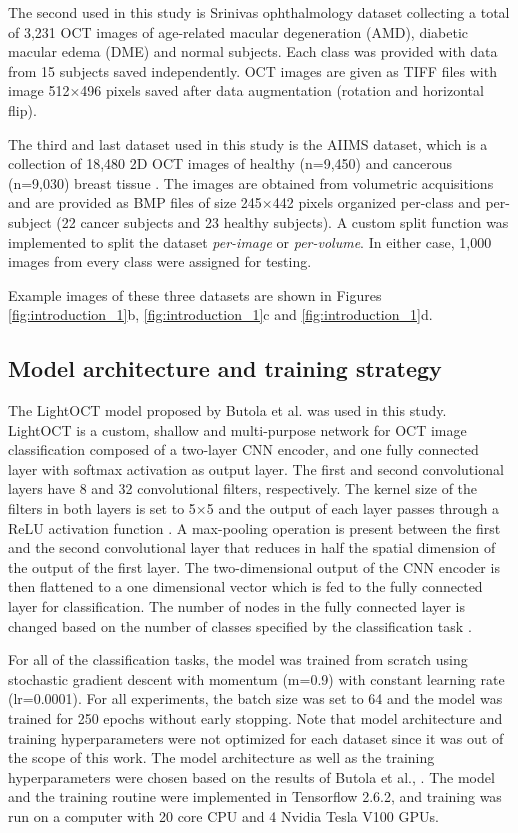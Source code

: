 \documentclass[fleqn,10pt]{wlscirep}
\begin{document}
The second used in this study is Srinivas ophthalmology dataset \cite{srinivasan2014fully} collecting a total of 3,231 OCT images of age-related macular degeneration (AMD),  diabetic macular edema (DME) and normal subjects.  Each class was provided with data from 15 subjects saved independently. OCT images are given as TIFF files with image 512$\times$496 pixels saved after data augmentation (rotation and horizontal flip).

The third and last dataset used in this study is the AIIMS dataset, which is a collection of 18,480 2D OCT images of healthy (n=9,450) and cancerous (n=9,030) breast tissue \cite{butola2019volumetric}. The images are obtained from volumetric acquisitions and are provided as BMP files of size 245$\times$442 pixels organized per-class and per-subject (22 cancer subjects and 23 healthy subjects). A custom split function was implemented to split the dataset \textit{per-image} or \textit{per-volume}. In either case, 1,000 images from every class were assigned for testing. 

 Example images of these three datasets are shown in Figures \ref{fig:introduction_1}b,  \ref{fig:introduction_1}c and \ref{fig:introduction_1}d. 

\subsection*{Model architecture and training strategy}
The LightOCT model proposed by Butola et al. \cite{butola2020deep} was used in this study. LightOCT is a custom, shallow and multi-purpose network for OCT image classification composed of a two-layer CNN encoder, and one fully connected layer with softmax activation as output layer. The first and second convolutional layers have 8 and 32 convolutional filters, respectively. The kernel size of the filters in both layers is set to 5$\times$5 and the output of each layer passes through a ReLU activation function \cite{butola2020deep}. A max-pooling operation is present between the first and the second convolutional layer that reduces in half the spatial dimension of the output of the first layer. The two-dimensional output of the CNN encoder is then flattened to a one dimensional vector which is fed to the fully connected layer for classification. The number of nodes in the fully connected layer is changed based on the number of classes specified by the classification task \cite{butola2020deep}. 

For all of the classification tasks, the model was trained from scratch using stochastic gradient descent with momentum (m=0.9) with constant learning rate (lr=0.0001). For all experiments, the batch size was set to 64 and the model was trained for 250 epochs without early stopping. Note that model architecture and training hyperparameters were not optimized for each dataset since it was out of the scope of this work. The model architecture as well as the training hyperparameters were chosen based on the results of Butola et al., \cite{butola2020deep}. The model and the training routine were implemented in Tensorflow 2.6.2, and training was run on a computer with 20 core CPU and 4 Nvidia Tesla V100 GPUs. 
\end{document}

